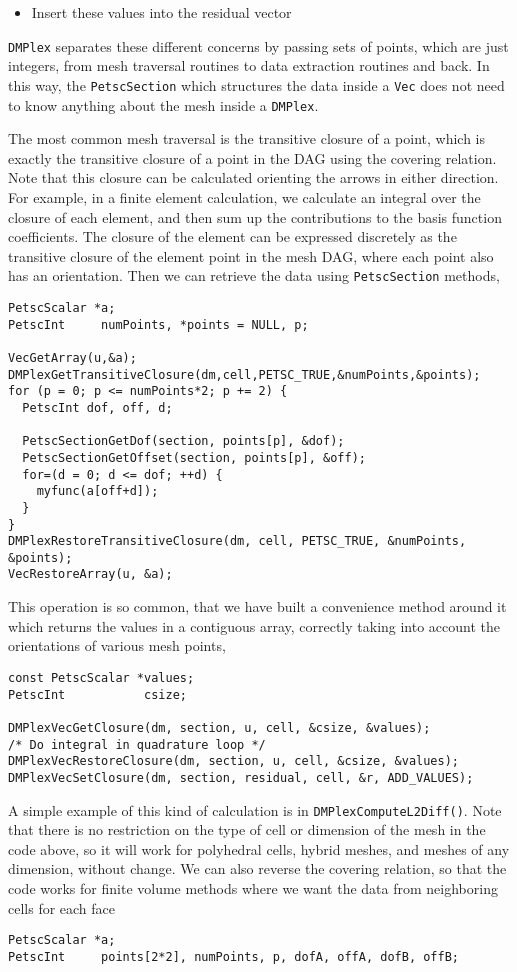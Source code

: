 {\begin{itemize}
  \item Insert these values into the residual vector
\end{itemize}
\lstinline{DMPlex} separates these different concerns by passing sets of points, which are just integers, from mesh traversal
routines to data extraction routines and back. In this way, the \lstinline{PetscSection} which structures the data inside a \lstinline{Vec} does
not need to know anything about the mesh inside a \lstinline{DMPlex}.

The most common mesh traversal is the transitive closure of a point, which is exactly the transitive closure of a point
in the DAG using the covering relation. Note that this closure can be calculated orienting the arrows in either
direction. For example, in a finite element calculation, we calculate an integral over the closure of each element, and
then sum up the contributions to the basis function coefficients. The closure of the element can be expressed discretely
as the transitive closure of the element point in the mesh DAG, where each point also has an orientation. Then we can
retrieve the data using \lstinline{PetscSection} methods,
\begin{lstlisting}
PetscScalar *a;
PetscInt     numPoints, *points = NULL, p;

VecGetArray(u,&a);
DMPlexGetTransitiveClosure(dm,cell,PETSC_TRUE,&numPoints,&points);
for (p = 0; p <= numPoints*2; p += 2) {
  PetscInt dof, off, d;

  PetscSectionGetDof(section, points[p], &dof);
  PetscSectionGetOffset(section, points[p], &off);
  for=(d = 0; d <= dof; ++d) {
    myfunc(a[off+d]);
  }
}
DMPlexRestoreTransitiveClosure(dm, cell, PETSC_TRUE, &numPoints, &points);
VecRestoreArray(u, &a);
\end{lstlisting}
This operation is so common, that we have built a convenience method around it which returns the values in a contiguous
array, correctly taking into account the orientations of various mesh points,
\begin{lstlisting}
const PetscScalar *values;
PetscInt           csize;

DMPlexVecGetClosure(dm, section, u, cell, &csize, &values);
/* Do integral in quadrature loop */
DMPlexVecRestoreClosure(dm, section, u, cell, &csize, &values);
DMPlexVecSetClosure(dm, section, residual, cell, &r, ADD_VALUES);
\end{lstlisting}
A simple example of this kind of calculation is in \lstinline{DMPlexComputeL2Diff()}. Note that there is no restriction on the
type of cell or dimension of the mesh in the code above, so it will work for polyhedral cells, hybrid meshes, and meshes
of any dimension, without change. We can also reverse the covering relation, so that the code works for finite volume
methods where we want the data from neighboring cells for each face
\begin{lstlisting}
PetscScalar *a;
PetscInt     points[2*2], numPoints, p, dofA, offA, dofB, offB;


\end{lstlisting}}

